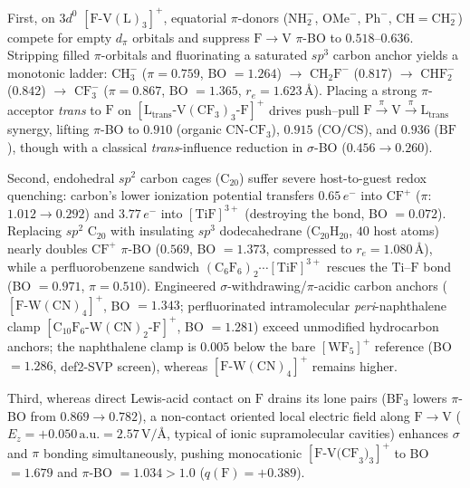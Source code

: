 \documentclass[10pt,twocolumn]{article}
\begin{document}
First, on $3d^0$ $[\mathrm{F\text{-}V(L)_3}]^+$, equatorial $\pi$-donors ($\mathrm{NH}_2^-$, $\mathrm{OMe}^-$, $\mathrm{Ph}^-$, $\mathrm{CH{=}CH}_2^-$) compete for empty $d_\pi$ orbitals and suppress $\mathrm{F}\to\mathrm{V}$ $\pi$-BO to $0.518$--$0.636$. Stripping filled $\pi$-orbitals and fluorinating a saturated $sp^3$ carbon anchor yields a monotonic ladder: $\mathrm{CH}_3^-$ ($\pi = 0.759$, BO $= 1.264$) $\to$ $\mathrm{CH}_2\mathrm{F}^-$ ($0.817$) $\to$ $\mathrm{CHF}_2^-$ ($0.842$) $\to$ $\mathrm{CF}_3^-$ ($\pi = 0.867$, BO $= 1.365$, $r_e = 1.623\,$\AA). Placing a strong $\pi$-acceptor \textit{trans} to $\mathrm{F}$ on $[\mathrm{L}_{\mathrm{trans}}\text{-}\mathrm{V}(\mathrm{CF}_3)_3\text{-}\mathrm{F}]^+$ drives push--pull $\mathrm{F}\xrightarrow{\pi}\mathrm{V}\xrightarrow{\pi}\mathrm{L}_{\mathrm{trans}}$ synergy, lifting $\pi$-BO to $0.910$ (organic $\mathrm{CN\text{-}CF}_3$), $0.915$ ($\mathrm{CO}/\mathrm{CS}$), and $0.936$ ($\mathrm{BF}$), though with a classical \textit{trans}-influence reduction in $\sigma$-BO ($0.456 \to 0.260$).

Second, endohedral $sp^2$ carbon cages ($\mathrm{C}_{20}$) suffer severe host-to-guest redox quenching: carbon's lower ionization potential transfers $0.65\,e^-$ into $\mathrm{CF}^+$ ($\pi$: $1.012 \to 0.292$) and $3.77\,e^-$ into $[\mathrm{TiF}]^{3+}$ (destroying the bond, BO $= 0.072$). Replacing $sp^2$ $\mathrm{C}_{20}$ with insulating $sp^3$ dodecahedrane ($\mathrm{C}_{20}\mathrm{H}_{20}$, $40$ host atoms) nearly doubles $\mathrm{CF}^+$ $\pi$-BO ($0.569$, BO $= 1.373$, compressed to $r_e = 1.080\,$\AA), while a perfluorobenzene sandwich $(\mathrm{C}_6\mathrm{F}_6)_2\cdots[\mathrm{TiF}]^{3+}$ rescues the $\mathrm{Ti\text{--}F}$ bond (BO $= 0.971$, $\pi = 0.510$). Engineered $\sigma$-withdrawing/$\pi$-acidic carbon anchors ($[\mathrm{F\text{-}W(CN)_4}]^+$, BO $= 1.343$; perfluorinated intramolecular \textit{peri}-naphthalene clamp $[\mathrm{C}_{10}\mathrm{F}_6\text{-}\mathrm{W}(\mathrm{CN})_2\text{-}\mathrm{F}]^+$, BO $= 1.281$) exceed unmodified hydrocarbon anchors; the naphthalene clamp is $0.005$ below the bare $[\mathrm{WF}_5]^+$ reference (BO $= 1.286$, def2-SVP screen), whereas $[\mathrm{F\text{-}W(CN)_4}]^+$ remains higher.

Third, whereas direct Lewis-acid contact on $\mathrm{F}$ drains its lone pairs ($\mathrm{BF}_3$ lowers $\pi$-BO from $0.869 \to 0.782$), a non-contact oriented local electric field along $\mathrm{F}\to\mathrm{V}$ ($E_z = +0.050\,\mathrm{a.u.} = 2.57\,\mathrm{V}/$\AA, typical of ionic supramolecular cavities) enhances $\sigma$ and $\pi$ bonding simultaneously, pushing monocationic $[\mathrm{F\text{-}V(CF}_3)_3]^+$ to BO $= 1.679$ and $\pi$-BO $= 1.034 > 1.0$ ($q(\mathrm{F}) = +0.389$).
\end{document}
